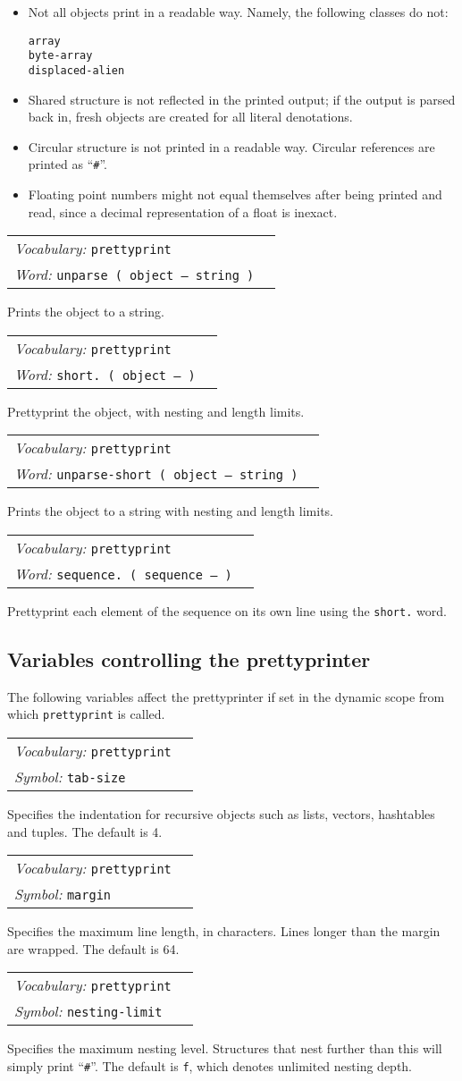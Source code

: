 \documentclass{book}
\newcommand{\vocabulary}[1]{\emph{Vocabulary:} \texttt{#1}&\\}
\newcommand{\ordinaryword}[2]{\index{\texttt{#1}}\emph{Word:} \texttt{#2}&\\}
\newcommand{\symbolword}[1]{\index{\texttt{#1}}\emph{Symbol:} \texttt{#1}&\\}
\newcommand{\wordtable}[1]{


\begin{tabularx}{12cm}{lX}
\hline
#1
\hline
\end{tabularx}

}
\begin{document}
\begin{itemize}
\item Not all objects print in a readable way. Namely, the following classes do not:
\begin{verbatim}
array
byte-array
displaced-alien
\end{verbatim}
\item Shared structure is not reflected in the printed output; if the output is parsed back in, fresh objects are created for all literal denotations.
\item Circular structure is not printed in a readable way. Circular references are printed as ``\texttt{\#}''.
\item Floating point numbers might not equal themselves after being printed and read, since a decimal representation of a float is inexact.
\end{itemize}
\wordtable{
\vocabulary{prettyprint}
\ordinaryword{unparse}{unparse~( object --~string )}
}
Prints the object to a string.
\wordtable{
\vocabulary{prettyprint}
\ordinaryword{short.}{short.~( object --~)}
}
Prettyprint the object, with nesting and length limits.
\wordtable{
\vocabulary{prettyprint}
\ordinaryword{unparse-short}{unparse-short~( object --~string )}
}
Prints the object to a string with nesting and length limits.
\wordtable{
\vocabulary{prettyprint}
\ordinaryword{sequence.}{sequence.~( sequence --~)}
}
Prettyprint each element of the sequence on its own line using the \verb|short.| word.

\subsection{Variables controlling the prettyprinter}

The following variables affect the prettyprinter if set in the dynamic scope from which \texttt{prettyprint} is called.

\wordtable{
\vocabulary{prettyprint}
\symbolword{tab-size}
}
Specifies the indentation for recursive objects such as lists, vectors, hashtables and tuples. The default is 4.

\wordtable{
\vocabulary{prettyprint}
\symbolword{margin}
}
Specifies the maximum line length, in characters. Lines longer than the margin are wrapped. The default is 64.

\wordtable{
\vocabulary{prettyprint}
\symbolword{nesting-limit}
}
Specifies the maximum nesting level. Structures that nest further than this will simply print ``\texttt{\#}''. The default is \texttt{f}, which denotes unlimited nesting depth.
\end{document}
